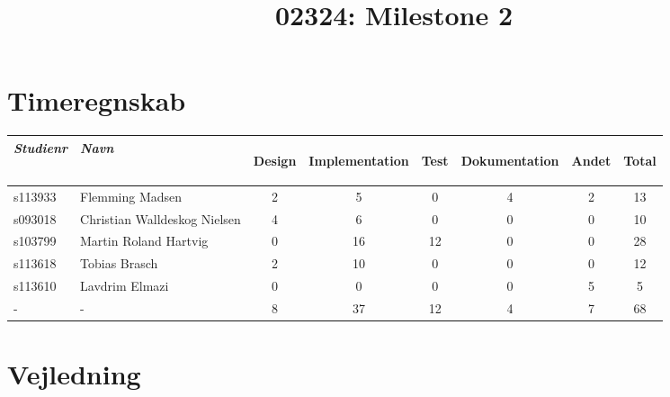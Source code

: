 \documentclass[a4paper]{article}
\title{02324: Milestone 2}
\author{
}
\begin{document}
\tableofcontents

\vspace{5cm}

\section{Timeregnskab} %
\label{sec:Timeregnskab}
\begin{tabular}{l l | c c c c c | c}

  \emph{Studienr} & \emph{Navn}
  & \begin{sideways}Design\end{sideways} 
  & \begin{sideways}Implementation\end{sideways} 
  & \begin{sideways}Test\end{sideways} 
  & \begin{sideways}Dokumentation\end{sideways} 
  & \begin{sideways}Andet\end{sideways} 
  & \begin{sideways}Total\end{sideways} \\
  \hline
  s113933 & Flemming Madsen              & 2 & 5  & 0  & 4 & 2 & 13 \\
  s093018 & Christian Walldeskog Nielsen & 4 & 6  & 0  & 0 & 0 & 10 \\
  s103799 & Martin Roland Hartvig        & 0 & 16 & 12 & 0 & 0 & 28 \\
  s113618 & Tobias Brasch                & 2 & 10 & 0  & 0 & 0 & 12 \\
  s113610 & Lavdrim Elmazi               & 0 & 0  & 0  & 0 & 5 & 5 \\
  \hline
  -       & -                            & 8 & 37 & 12 & 4 & 7 & 68
  
\end{tabular}


\clearpage



\section{Vejledning} %
\label{sec:Vejledning}

\end{document}
